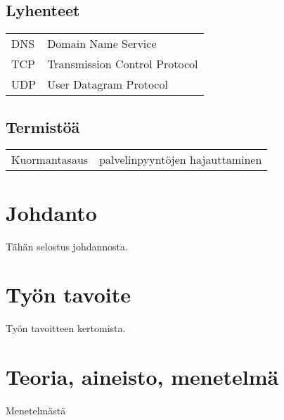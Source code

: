\documentclass[finnish,12pt,a4paper,pdftex,elec,utf8]{aaltothesis}
\begin{document}
\newpage


\thesistableofcontents



\subsection*{Lyhenteet}

\begin{tabular}{ll}
    DNS & Domain Name Service \\
    TCP & Transmission Control Protocol\\
    UDP & User Datagram Protocol\\
\end{tabular}
\subsection*{Termistöä}

\begin{tabular}{ll}
    Kuormantasaus & palvelinpyyntöjen hajauttaminen\\
\end{tabular}


\cleardoublepage
\storeinipagenumber
{}
\setcounter{page}{1}


\section{Johdanto}
Tähän selostus johdannosta.
\section{Työn tavoite}
Työn tavoitteen kertomista.
\section{Teoria, aineisto, menetelmä}
Menetelmästä
\newpage
\end{document}
